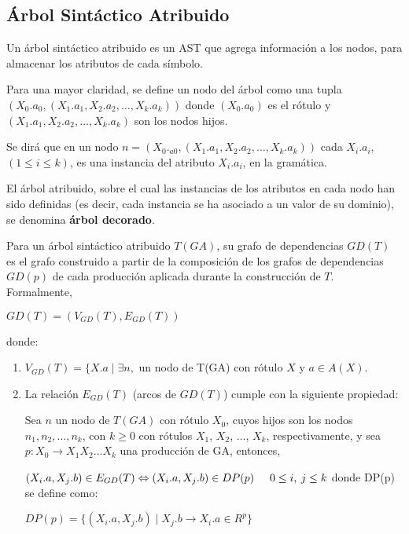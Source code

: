 \subsection{Árbol Sintáctico Atribuido}

Un árbol sintáctico atribuido es un AST que agrega información a los nodos, para almacenar los atributos de cada símbolo.

Para una mayor claridad, se define un nodo del árbol como una tupla $(X_{0}.a_{0}, (X_{1}.a_{1}, X_{2}.a_{2}, \ldots , X_{k}.a_{k}))$ donde $(X_{0}.a_{0})$ es el rótulo y $(X_{1}.a_{1}, X_{2}.a_{2}, \ldots , X_{k}.a_{k})$ son los nodos hijos.

Se dirá que en un nodo $n = (X_{0}._{a0}, (X_{1}.a_{1}, X_{2}.a_{2}, \ldots, X_{k}.a_{k}))$ cada $X_{i}.a_{i}$, $(1 \leq i \leq k)$, es una instancia del atributo $X_{i}.a_{i}$, en la gramática.

\begin{definition} 
\label{def:ast-attr}
El árbol atribuido, sobre el cual las instancias de los atributos en cada nodo han sido definidas (es decir, cada instancia se ha asociado a un valor de su dominio), se denomina \textbf{árbol decorado}.
\end{definition}

\begin{definition} Para un árbol sintáctico atribuido $T(GA)$, su grafo de dependencias $GD(T)$ es el grafo construido a partir de la composición de los grafos de dependencias $GD(p)$ de cada producción aplicada durante la construcción de $T$. Formalmente,

\begin{center}$GD(T)=(V_{GD}(T),E_{GD}(T))$\end{center}

donde:

\begin{enumerate}
\item $ V_{GD}(T) = \{ X.a \mid \exists n, $ un nodo de T(GA) con rótulo $ X $ y $a \in A(X)$.
      
\item La relación $ E_{GD}(T) $ (arcos de $ GD(T) $) cumple con la siguiente propiedad:

      Sea $n$ un nodo de $T(GA)$ con rótulo $X_0$, cuyos hijos son los nodos $ n_1, n_2, \ldots ,n_k $, con $ k \geq 0 $ con rótulos $ X_1 $, $ X_2 $, $\ldots$, $ X_k $, respectivamente, y sea $p:X_0 \rightarrow X_1 X_2 \ldots X_k$ una producción de GA, entonces,
      
      $ (X_{i}.a,X_{j}.b) \in E_{GD}(T) \Leftrightarrow (X_{i}.a,X_{j}.b) \in DP(p) \hspace{0.5cm} 0 \leq i, \: j \leq k $
donde DP(p) se define como:

\begin{center}$DP(p) = \{(X_{i}.a,X_{j}.b) \mid X_{j}.b \rightarrow X_{i}.a \in R^{p}\}$\end{center}

\end{enumerate}
\end{definition}

